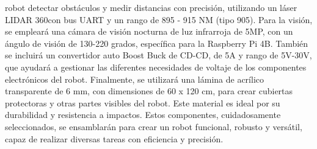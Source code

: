         robot detectar obst\'aculos y medir distancias con precisi\'on, utilizando un l\'aser LIDAR 360\degree con bus UART 
        y un rango de 895 - 915 NM (tipo 905).
    \vskip 0.5cm
    Para la visi\'on, se emplear\'a una c\'amara de visi\'on nocturna de luz infrarroja de 5MP, con un \'angulo de visi\'on de 
        130-220 grados, espec\'ifica para la Raspberry Pi 4B. Tambi\'en se incluir\'a un convertidor auto Boost Buck de CD-CD, 
        de 5A y rango de 5V-30V, que ayudar\'a a gestionar las diferentes necesidades de voltaje de los componentes 
        electr\'onicos del robot.
    \vskip 0.5cm
    Finalmente, se utilizar\'a una l\'amina de acr\'ilico transparente de 6 mm, con dimensiones de 60 x 120 cm, 
        para crear cubiertas protectoras y otras partes visibles del robot. Este material es ideal por su 
        durabilidad y resistencia a impactos.
    \vskip 0.5cm
    Estos componentes, cuidadosamente seleccionados, se ensamblar\'an para crear un robot funcional, 
        robusto y vers\'atil, capaz de realizar diversas tareas con eficiencia y precisi\'on.
